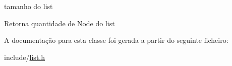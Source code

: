 tamanho do list 

\begin{DoxyReturn}{Retorna}
quantidade de Node do list 
\end{DoxyReturn}


A documentação para esta classe foi gerada a partir do seguinte ficheiro\+:\begin{DoxyCompactItemize}
\item 
include/\hyperlink{list_8h}{list.\+h}\end{DoxyCompactItemize}
